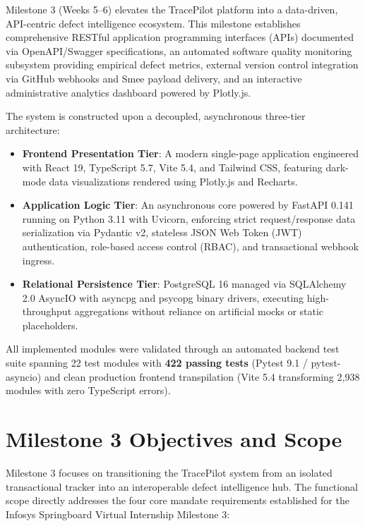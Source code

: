 \documentclass[11pt,a4paper]{article}
\begin{document}
Milestone 3 (Weeks 5--6) elevates the TracePilot platform into a data-driven, API-centric defect intelligence ecosystem. This milestone establishes comprehensive RESTful application programming interfaces (APIs) documented via OpenAPI/Swagger specifications, an automated software quality monitoring subsystem providing empirical defect metrics, external version control integration via GitHub webhooks and Smee payload delivery, and an interactive administrative analytics dashboard powered by Plotly.js.

The system is constructed upon a decoupled, asynchronous three-tier architecture:
\begin{itemize}
    \item \textbf{Frontend Presentation Tier}: A modern single-page application engineered with React 19, TypeScript 5.7, Vite 5.4, and Tailwind CSS, featuring dark-mode data visualizations rendered using Plotly.js and Recharts.
    \item \textbf{Application Logic Tier}: An asynchronous core powered by FastAPI 0.141 running on Python 3.11 with Uvicorn, enforcing strict request/response data serialization via Pydantic v2, stateless JSON Web Token (JWT) authentication, role-based access control (RBAC), and transactional webhook ingress.
    \item \textbf{Relational Persistence Tier}: PostgreSQL 16 managed via SQLAlchemy 2.0 AsyncIO with asyncpg and psycopg binary drivers, executing high-throughput aggregations without reliance on artificial mocks or static placeholders.
\end{itemize}

All implemented modules were validated through an automated backend test suite spanning 22 test modules with \textbf{422 passing tests} (Pytest 9.1 / pytest-asyncio) and clean production frontend transpilation (Vite 5.4 transforming 2,938 modules with zero TypeScript errors).

\section{Milestone 3 Objectives and Scope}
Milestone 3 focuses on transitioning the TracePilot system from an isolated transactional tracker into an interoperable defect intelligence hub. The functional scope directly addresses the four core mandate requirements established for the Infosys Springboard Virtual Internship Milestone 3:
\end{document}
